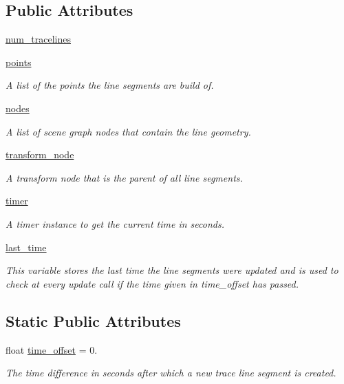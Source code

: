 \subsection*{\-Public \-Attributes}
\begin{DoxyCompactItemize}
\item 
\hyperlink{classlib_1_1TraceLines_1_1Trace_abb0ceca2fc653eacbd487d148936b812}{num\-\_\-tracelines}
\item 
\hyperlink{classlib_1_1TraceLines_1_1Trace_a2eadb743166a1588111d13912c754286}{points}
\begin{DoxyCompactList}\small\item\em \-A list of the points the line segments are build of. \end{DoxyCompactList}\item 
\hyperlink{classlib_1_1TraceLines_1_1Trace_a1c6a11f08dde1fc15914300612a7512f}{nodes}
\begin{DoxyCompactList}\small\item\em \-A list of scene graph nodes that contain the line geometry. \end{DoxyCompactList}\item 
\hyperlink{classlib_1_1TraceLines_1_1Trace_ab1358d4b3c99823b5efc88d95c24e788}{transform\-\_\-node}
\begin{DoxyCompactList}\small\item\em \-A transform node that is the parent of all line segments. \end{DoxyCompactList}\item 
\hyperlink{classlib_1_1TraceLines_1_1Trace_ac824c023e057eee6a3c9325490378921}{timer}
\begin{DoxyCompactList}\small\item\em \-A timer instance to get the current time in seconds. \end{DoxyCompactList}\item 
\hyperlink{classlib_1_1TraceLines_1_1Trace_aebc9a249a4841b2c7da8d6f79cc30d5e}{last\-\_\-time}
\begin{DoxyCompactList}\small\item\em \-This variable stores the last time the line segments were updated and is used to check at every update call if the time given in time\-\_\-offset has passed. \end{DoxyCompactList}\end{DoxyCompactItemize}
\subsection*{\-Static \-Public \-Attributes}
\begin{DoxyCompactItemize}
\item 
float \hyperlink{classlib_1_1TraceLines_1_1Trace_a6073eb4ce8fe976d355ac54ded5b63f3}{time\-\_\-offset} = 0.
\begin{DoxyCompactList}\small\item\em \-The time difference in seconds after which a new trace line segment is created. \end{DoxyCompactList}\end{DoxyCompactItemize}


